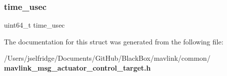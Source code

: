 \mbox{\label{struct____mavlink__actuator__control__target__t_a2db60704c293664dcb6159b55c98c2f2}} 
\subsubsection{time\+\_\+usec}
{\footnotesize\ttfamily uint64\+\_\+t time\+\_\+usec}



The documentation for this struct was generated from the following file\+:\begin{DoxyCompactItemize}
\item 
/\+Users/jselfridge/\+Documents/\+Git\+Hub/\+Black\+Box/mavlink/common/\textbf{ mavlink\+\_\+msg\+\_\+actuator\+\_\+control\+\_\+target.\+h}\end{DoxyCompactItemize}
